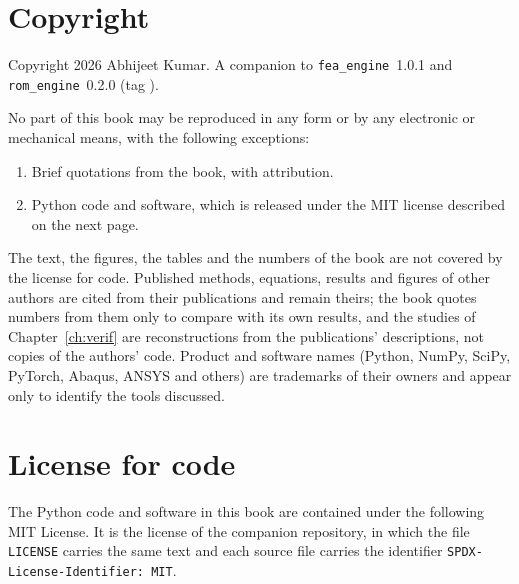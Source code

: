 \chapter*{Copyright}
\thispagestyle{plain}

Copyright \textcopyright{} 2026 Abhijeet Kumar. A companion to \texttt{fea\_engine}~1.0.1 and \texttt{rom\_engine}~0.2.0 (tag \booktag).

No part of this book may be reproduced in any form or by any electronic or mechanical means, with the following exceptions:
\begin{enumerate}
\item Brief quotations from the book, with attribution.
\item Python code and software, which is released under the MIT license described on the next page.
\end{enumerate}

The text, the figures, the tables and the numbers of the book are not covered by the license for code. Published methods, equations, results and figures of other authors are cited from their publications and remain theirs; the book quotes numbers from them only to compare with its own results, and the studies of Chapter~\ref{ch:verif} are reconstructions from the publications' descriptions, not copies of the authors' code. Product and software names (Python, NumPy, SciPy, PyTorch, Abaqus, ANSYS and others) are trademarks of their owners and appear only to identify the tools discussed.

\chapter*{License for code}
\thispagestyle{plain}

The Python code and software in this book are contained under the following MIT License. It is the license of the companion repository, in which the file \texttt{LICENSE} carries the same text and each source file carries the identifier \texttt{SPDX-License-Identifier: MIT}.

